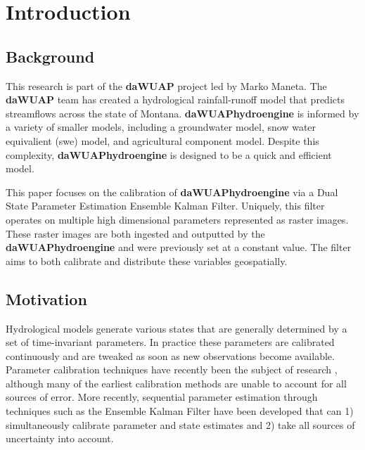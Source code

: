 \chapter{Introduction}

\section{Background}

This research is part of the \textbf{daWUAP} project led by Marko Maneta. The \textbf{daWUAP} team has created a hydrological rainfall-runoff model that predicts streamflows across the state of Montana. \textbf{daWUAPhydroengine} is informed by a variety of smaller models, including a groundwater model, snow water equivalient (swe) model, and agricultural component model. Despite this complexity, \textbf{daWUAPhydroengine} is designed to be a quick and efficient model.

This paper focuses on the calibration of \textbf{daWUAPhydroengine} via a Dual State Parameter Estimation Ensemble Kalman Filter. Uniquely, this filter operates on multiple high dimensional parameters represented as raster images. These raster images are both ingested and outputted by the \textbf{daWUAPhydroengine} and were previously set at a constant value. The filter aims to both calibrate and distribute these variables geospatially. 

\section{Motivation}
\label{ch1:opts}

Hydrological models generate various states that are generally determined by a set of time-invariant parameters. In practice these parameters are calibrated continuously and are tweaked as soon as new observations become available. Parameter calibration techniques have recently been the subject of research \cite{Xie2010} \cite{Sorooshian1993}, although many of the earliest calibration methods are unable to account for all sources of error\cite{Evensen1994}. More recently, sequential parameter estimation through techniques such as the Ensemble Kalman Filter have been developed that can 1) simultaneously calibrate parameter and state estimates and 2) take all sources of uncertainty into account\cite{Evensen2003}.


